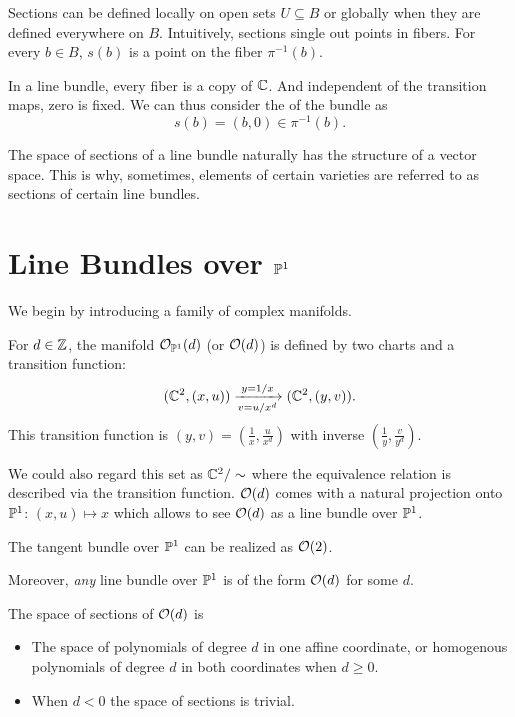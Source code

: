 \documentclass[12pt]{memoir}
\begin{document}
    Sections can be defined locally on open sets $U\subseteq B$ or globally when they are defined everywhere on $B$. Intuitively, sections single out points in fibers. For every $b\in B$, $s(b)$ is a point on the fiber $\pi^{-1}(b)$.

    \begin{Ex}
        In a line bundle, every fiber is a copy of $\mathbb{C}$. And independent of the transition maps, zero is fixed. We can thus consider the  of the bundle as 
        $$s(b)=(b,0)\in\pi^{-1}(b).$$
    \end{Ex}

    The space of sections of a line bundle naturally has the structure of a vector space. This is why, sometimes, elements of certain varieties are referred to as sections of certain line bundles. 

    \section{Line Bundles over $\mathbb{P}^1$}

    We begin by introducing a family of complex manifolds.

\begin{Def}
    For $d\in\mathbb{Z}$, the manifold $\mathcal{O}_{\mathbb{P}^1}(d)$ (or $\mathcal{O}(d)$) is defined by two charts and a transition function:
    $$(\mathbb{C}^2,(x,u))\xrightarrow[v=u/x^d]{y=1/x}(\mathbb{C}^2,(y,v)).$$
    This transition function is  $(y,v)=\left(\frac{1}{x},\frac{u}{x^d}\right)$ with inverse $\left(\frac{1}{y},\frac{v}{y^d}\right)$.
\end{Def}

We could also regard this set as $\mathbb{C}^2/\sim$ where the equivalence relation is described via the transition function. $\mathcal{O}(d)$ comes with a natural projection onto $\mathbb{P}^1$: $(x,u)\mapsto x$ which allows to see $\mathcal{O}(d)$ as a line bundle over $\mathbb{P}^1$. 

\begin{Ex}
The tangent bundle over $\mathbb{P}^1$ can be realized as $\mathcal{O}(2)$. 
\end{Ex}

Moreover, \emph{any} line bundle over $\mathbb{P}^1$ is of the form $\mathcal{O}(d)$ for some $d$.  

\begin{Th}
The space of sections of $\mathcal{O}(d)$ is
\begin{itemize}
    \item The space of polynomials of degree $d$ in one affine coordinate, or homogenous polynomials of degree $d$ in both coordinates when $d\geq 0$.
    \item When $d<0$ the space of sections is trivial.
\end{itemize}
\end{Th}
\end{document}
